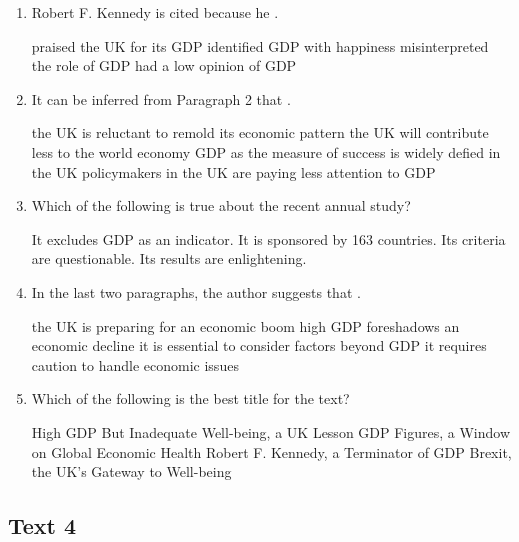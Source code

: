 \begin{enumerate}[resume]
	\item
Robert F. Kennedy is cited because he  \lineread.


\fourchoices
{praised the UK for its GDP}
{identified GDP with happiness}
{misinterpreted the role of GDP}
{had a low opinion of GDP}



\item
It can be inferred from Paragraph 2 that  \lineread.


\fourchoices
{the UK is reluctant to remold its economic pattern}
{the UK will contribute less to the world economy}
{GDP as the measure of success is widely defied in the UK}
{policymakers in the UK are paying less attention to GDP}


\item
Which of the following is true about the recent annual study?


\fourchoices
{It excludes GDP as an indicator.}
{It is sponsored by 163 countries.}
{Its criteria are questionable.}
{Its results are enlightening.}


\item
 In the last two paragraphs, the author suggests that \lineread.


\fourchoices
{the UK is preparing for an economic boom}
{high GDP foreshadows an economic decline}
{it is essential to consider factors beyond GDP}
{it requires caution to handle economic issues}



\item
Which of the following is the best title for the text?


\fourchoices
{High GDP But Inadequate Well-being, a UK Lesson}
{GDP Figures, a Window on Global Economic Health}
{Robert F. Kennedy, a Terminator of GDP}
{Brexit, the UK's Gateway to Well-being}
	
\end{enumerate}


\newpage
\subsection{Text 4}


